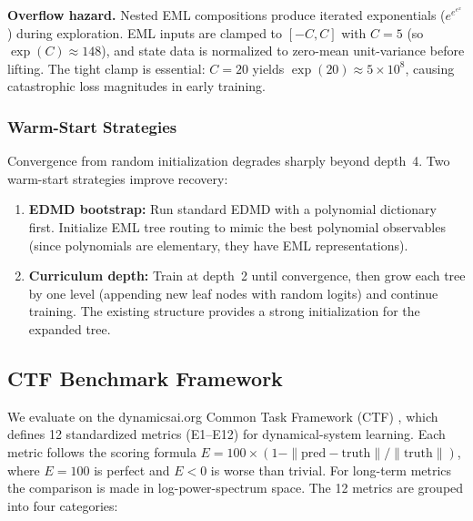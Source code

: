 \documentclass[11pt]{article}
\begin{document}
\noindent
\textbf{Overflow hazard.}  Nested EML compositions produce iterated exponentials
($e^{e^{e^x}}$) during exploration.  EML inputs are clamped to $[-C, C]$ with
$C = 5$ (so $\exp(C) \approx 148$), and state data is normalized to zero-mean
unit-variance before lifting.  The tight clamp is essential: $C = 20$ yields
$\exp(20) \approx 5 \times 10^8$, causing catastrophic loss magnitudes in early
training.

\subsubsection{Warm-Start Strategies}

Convergence from random initialization degrades sharply beyond depth~4.  Two
warm-start strategies improve recovery:

\begin{enumerate}
  \item \textbf{EDMD bootstrap:} Run standard EDMD with a polynomial dictionary
    first.  Initialize EML tree routing to mimic the best polynomial observables
    (since polynomials are elementary, they have EML representations).
  \item \textbf{Curriculum depth:} Train at depth~2 until convergence, then grow
    each tree by one level (appending new leaf nodes with random logits) and
    continue training.  The existing structure provides a strong initialization for
    the expanded tree.
\end{enumerate}


\subsection{CTF Benchmark Framework}
\label{sec:ctf}

We evaluate on the dynamicsai.org Common Task Framework
(CTF) \citep{wyder2025}, which defines
12 standardized metrics (E1--E12) for dynamical-system learning.  Each metric
follows the scoring formula
$E = 100 \times (1 - \|\text{pred} - \text{truth}\| / \|\text{truth}\|)$,
where $E = 100$ is perfect and $E < 0$ is worse than trivial.
For long-term metrics the comparison is made in log-power-spectrum space.
The 12 metrics are grouped into four categories:
\end{document}
